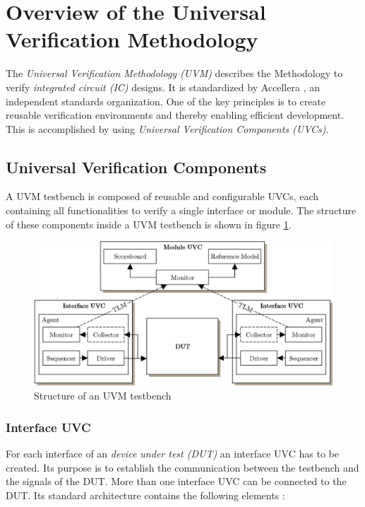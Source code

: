 \section{Overview of the Universal Verification Methodology}\label{uvm}

The \emph{Universal Verification Methodology (UVM)} describes the Methodology to
verify \emph{integrated circuit (IC)} designs. It is standardized by Accellera \cite{uvm},
an independent standards organization. One of the key principles is to create
reusable verification environments and thereby enabling efficient development.
This is accomplished by using \emph{Universal Verification Components (UVCs)}.

\subsection{Universal Verification Components}\label{uvc}

A UVM testbench is composed of reusable and configurable UVCs, each
containing all functionalities to verify a single interface or module. The
structure of these components inside a UVM testbench is shown in figure
\ref{fig:UVM_testbench}.

\begin{figure}[htb]
 \centering
 \includegraphics[scale=0.3]{abb/UVM_testbench}
 \caption{Structure of an UVM testbench}
\label{fig:UVM_testbench}
\end{figure}

\subsubsection{Interface UVC}\label{interface_uvc}

For each interface of an \emph{device under test (DUT)} an interface UVC has
to be created. Its purpose is to establish the communication between
the testbench and the signals of the DUT. More than one interface UVC can be
connected to the DUT. Its standard architecture contains the following elements \cite{uvm_sv}:

